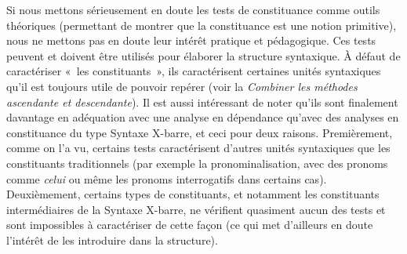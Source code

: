{    Si nous mettons sérieusement en doute les tests de constituance comme outils théoriques (permettant de montrer que la constituance est une notion primitive), nous ne mettons pas en doute leur intérêt pratique et pédagogique. Ces tests peuvent et doivent être utilisés pour élaborer la structure syntaxique. À défaut de caractériser «~les constituants~», ils caractérisent certaines unités syntaxiques qu’il est toujours utile de pouvoir repérer (voir la  \textit{Combiner les méthodes ascendante et descendante}). Il est aussi intéressant de noter qu’ils sont finalement davantage en adéquation avec une analyse en dépendance qu’avec des analyses en constituance du type Syntaxe X-barre, et ceci pour deux raisons. Premièrement, comme on l’a vu, certains tests caractérisent d’autres unités syntaxiques que les constituants traditionnels (par exemple la pronominalisation, avec des pronoms comme \textit{celui} ou même les pronoms interrogatifs dans certains cas). Deuxièmement, certains types de constituants, et notamment les constituants intermédiaires de la Syntaxe X-barre, ne vérifient quasiment aucun des tests et sont impossibles à caractériser de cette façon (ce qui met d’ailleurs en doute l’intérêt de les introduire dans la structure).
}
